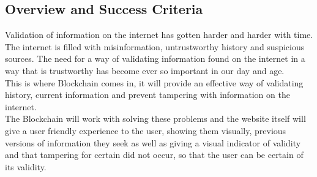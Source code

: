 \subsection{Overview and Success Criteria}

Validation of information on the internet has gotten harder and harder with time.
The internet is filled with misinformation, untrustworthy history and suspicious 
sources. The need for a way of validating information found on the internet in a 
way that is trustworthy has become ever so important in our day and age.\\

This is where Blockchain comes in, it will provide an effective way of validating
history, current information and prevent tampering with information on the internet.\\

The Blockchain will work with solving these problems and the website itself will
give a user friendly experience to the user, showing them visually, previous versions
of information they seek as well as giving a visual indicator of validity and that
tampering for certain did not occur, so that the user can be certain of its validity.
